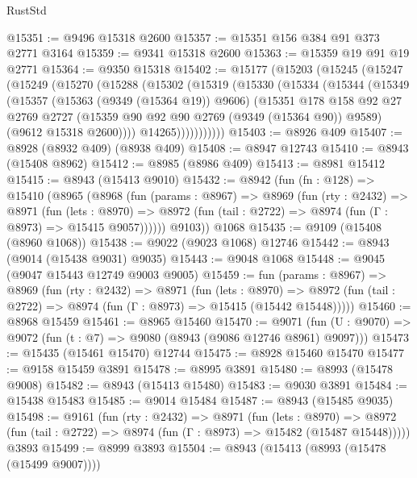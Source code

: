 \begin{lexlean}{RustStd}
\begin{coremodule}
{\begin{coremodule}
{{{{{{{{{{{{{{{{{{{{{{{{{{{{{{{{{{{{{{{@15351 := @9496 @15318 @2600
@15357 := @15351 @156 @384 @91 @373 @2771 @3164
@15359 := @9341 @15318 @2600
@15363 := @15359 @19 @91 @19 @2771
@15364 := @9350 @15318
@15402 := @15177
    (@15203
      (@15245
        (@15247
          (@15249
            (@15270
              (@15288
                (@15302
                  (@15319
                    (@15330
                      (@15334
                        (@15344
                          (@15349
                            (@15357
                              (@15363 (@9349 (@15364 @19)) @9606)
                              (@15351
                                @178
                                @158
                                @92
                                @27
                                @2769
                                @2727
                                (@15359 @90 @92 @90 @2769 (@9349 (@15364 @90)) @9589)
                                (@9612 @15318 @2600))))
                          @14265)))))))))))
@15403 := @8926 @409
@15407 := @8928 (@8932 @409) (@8938 @409)
@15408 := @8947 @12743
@15410 := @8943 (@15408 @8962)
@15412 := @8985 (@8986 @409)
@15413 := @8981 @15412
@15415 := @8943 (@15413 @9010)
@15432 := @8942
    (fun (fn : @128) =>
    @15410
      (@8965
        (@8968
          (fun (params : @8967) =>
          @8969
            (fun (rty : @2432) =>
            @8971
              (fun (lets : @8970) =>
              @8972 (fun (tail : @2722) => @8974 (fun (Γ : @8973) => @15415 @9057))))))
        @9103))
    @1068
@15435 := @9109 (@15408 (@8960 @1068))
@15438 := @9022 (@9023 @1068) @12746
@15442 := @8943 (@9014 (@15438 @9031) @9035)
@15443 := @9048 @1068
@15448 := @9045 (@9047 @15443 @12749 @9003 @9005)
@15459 := fun (params : @8967) =>
  @8969
    (fun (rty : @2432) =>
    @8971
      (fun (lets : @8970) =>
      @8972 (fun (tail : @2722) => @8974 (fun (Γ : @8973) => @15415 (@15442 @15448)))))
@15460 := @8968 @15459
@15461 := @8965 @15460
@15470 := @9071
    (fun (U : @9070) => @9072 (fun (t : @7) => @9080 (@8943 (@9086 @12746 @8961) @9097)))
@15473 := @15435 (@15461 @15470) @12744
@15475 := @8928 @15460 @15470
@15477 := @9158 @15459 @3891
@15478 := @8995 @3891
@15480 := @8993 (@15478 @9008)
@15482 := @8943 (@15413 @15480)
@15483 := @9030 @3891
@15484 := @15438 @15483
@15485 := @9014 @15484
@15487 := @8943 (@15485 @9035)
@15498 := @9161
    (fun (rty : @2432) =>
    @8971
      (fun (lets : @8970) =>
      @8972 (fun (tail : @2722) => @8974 (fun (Γ : @8973) => @15482 (@15487 @15448)))))
    @3893
@15499 := @8999 @3893
@15504 := @8943 (@15413 (@8993 (@15478 (@15499 @9007))))
}}}}}}}}}}}}}}}}}}}}}}}}}}}}}}}}}}}}}}}
\end{coremodule}}
\end{coremodule}
\end{lexlean}
